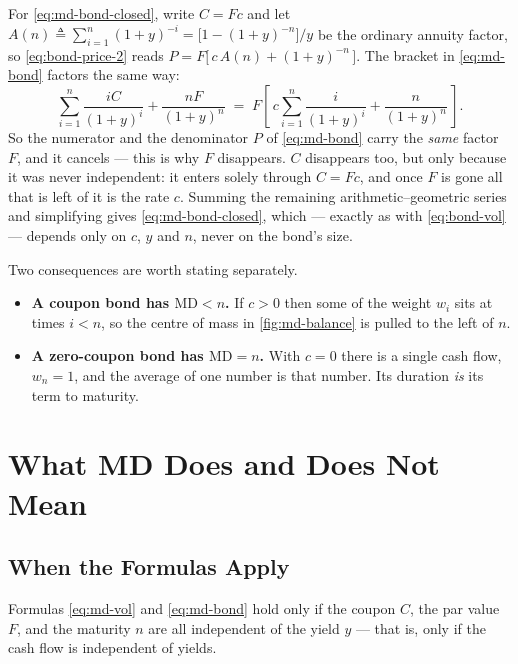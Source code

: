 For \eqref{eq:md-bond-closed}, write $C=Fc$ and let $A(n)\triangleq\sum_{i=1}^{n}(1+y)^{-i}=\bigl[1-(1+y)^{-n}\bigr]/y$ be the ordinary annuity factor, so \eqref{eq:bond-price-2} reads $P=F\bigl[\,c\,A(n)+(1+y)^{-n}\,\bigr]$.
The bracket in \eqref{eq:md-bond} factors the same way:
\[
	\sum_{i=1}^{n}\frac{iC}{(1+y)^{i}} + \frac{nF}{(1+y)^{n}}
	\;=\; F\left[\,c\sum_{i=1}^{n}\frac{i}{(1+y)^{i}} + \frac{n}{(1+y)^{n}}\,\right] .
\]
So the numerator and the denominator $P$ of \eqref{eq:md-bond} carry the \emph{same} factor $F$, and it cancels --- this is why $F$ disappears.
$C$ disappears too, but only because it was never independent: it enters solely through $C=Fc$, and once $F$ is gone all that is left of it is the rate $c$.
Summing the remaining arithmetic--geometric series and simplifying gives \eqref{eq:md-bond-closed}, which --- exactly as with \eqref{eq:bond-vol} --- depends only on $c$, $y$ and $n$, never on the bond's size.
\suppend

Two consequences are worth stating separately.

\begin{itemize}[itemsep=0.35em]
	\item \textbf{A coupon bond has $\mathrm{MD}<n$.}
	      If $c>0$ then some of the weight $w_{i}$ sits at times $i<n$, so the centre of mass in \autoref{fig:md-balance} is pulled to the left of $n$.
	\item \textbf{A zero-coupon bond has $\mathrm{MD}=n$.}
	      With $c=0$ there is a single cash flow, $w_{n}=1$, and the average of one number is that number.
	      Its duration \emph{is} its term to maturity.
\end{itemize}

\section{What MD Does and Does Not Mean}
\label{sec:md-caveats}

\subsection{When the Formulas Apply}


\begin{note}
	Formulas \eqref{eq:md-vol} and \eqref{eq:md-bond} hold only if the coupon $C$, the par value $F$, and the maturity $n$ are all independent of the yield $y$ --- that is, only if the cash flow is independent of yields.
\end{note}

